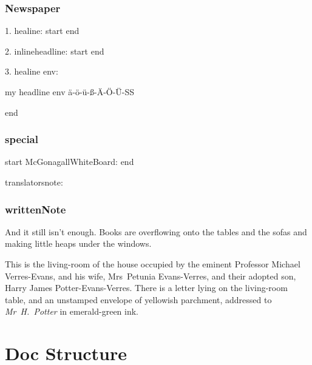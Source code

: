 \section{Newspaper}

1. healine: start  end

2. inlineheadline: start  end

3. healine env:
\begin{headlines}
my headline env ä-ö-ü-ß-Ä-Ö-Ü-SS
\end{headlines}
end

\section{special}
start McGonagallWhiteBoard:  end

translatorsnote:

\section{writtenNote}
\begin{writtenNote}
\end{writtenNote}

\begin{writtenNote}
And it still isn’t enough. Books are overflowing onto the tables and the sofas and making little heaps under the windows.

This is the living-room of the house occupied by the eminent Professor Michael Verres-Evans, and his wife, Mrs~Petunia Evans-Verres, and their adopted son, Harry James Potter-Evans-Verres. There is a letter lying on the living-room table, and an unstamped envelope of yellowish parchment, addressed to \emph{Mr~H.~Potter} in emerald-green ink.
\end{writtenNote}

\part{Doc Structure}

